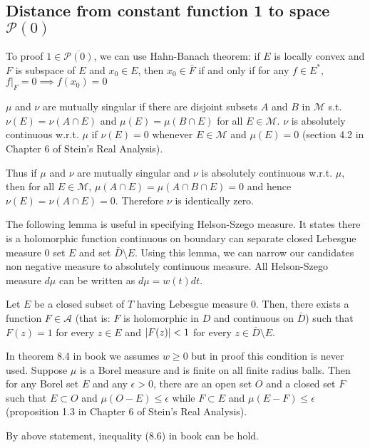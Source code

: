 \subsection{Distance from constant function 1 to space $\mathscr{P}(0)$}
\begin{remark}
    To proof $1\in\overline{\mathscr{P}(0)}$, we can use Hahn-Banach theorem: if $E$ is locally convex and $F$ is subspace of $E$ and $x_0\in E$, then $x_0\in \bar{F}$ if and only if for
    any $f\in E^*$, $f\vert_F=0 \implies f(x_0)=0$\par
    $\mu$ and $\nu$ are mutually singular if there are disjoint subsets $A$ and $B$ in $\mathscr{M}$ s.t. $\nu(E)=\nu(A\cap E)$ and
    $\mu(E)=\mu(B\cap E)$ for all $E\in\mathscr{M}$. $\nu$ is absolutely continuous w.r.t. $\mu$ if $\nu(E)=0$ whenever $E\in\mathscr{M}$ and $\mu(E)=0$ (section 4.2 in Chapter 6 of Stein’s Real Analysis).\par
    Thus if $\mu$ and $\nu$ are mutually singular and $\nu$ is absolutely continuous w.r.t. $\mu$, then for all $E\in\mathscr{M}$, $\mu(A\cap E)=\mu(A\cap B\cap E)=0$ and hence $\nu(E)=\nu(A\cap E)=0$. Therefore $\nu$ is identically zero.
\end{remark}
The following lemma is useful in specifying Helson-Szego measure. It states there is a holomorphic function continuous on boundary can separate closed Lebesgue measure 0 set $E$ and set $\bar{D}\setminus E$. Using this lemma, we can narrow our candidates non negative measure to absolutely continuous measure. All Helson-Szego measure $d\mu$ can be written as $d\mu=w(t)dt$.\par
\begin{lemma}\label{separate zero measure}
    Let $E$ be a closed subset of $T$ having Lebesgue measure 0. Then, there exists a function $F\in\mathscr{A}$ (that is: $F$ is holomorphic in $D$ and
    continuous on $\bar{D}$) such that $F(z)=1$ for every $z\in E$ and $\left\lvert F(z)\right\rvert<1$ for every $z\in\bar{D}\setminus E$.
\end{lemma}
\begin{remark}
    {\color{blue}In theorem 8.4 in book we assumes $w\geq 0$ but in proof this condition is never used}.
    Suppose $\mu$ is a Borel measure and is finite on all finite radius balls. Then for any Borel set $E$ and any $\epsilon>0$, there are an open
    set $O$ and a closed set $F$ such that $E\subset O$ and $\mu(O-E)\leq\epsilon$ while $F\subset E$ and $\mu(E-F)\leq\epsilon$ (proposition 1.3 in Chapter 6 of Stein’s Real Analysis).\par
    By above statement, inequality (8.6) in book can be hold.\par
\end{remark}
